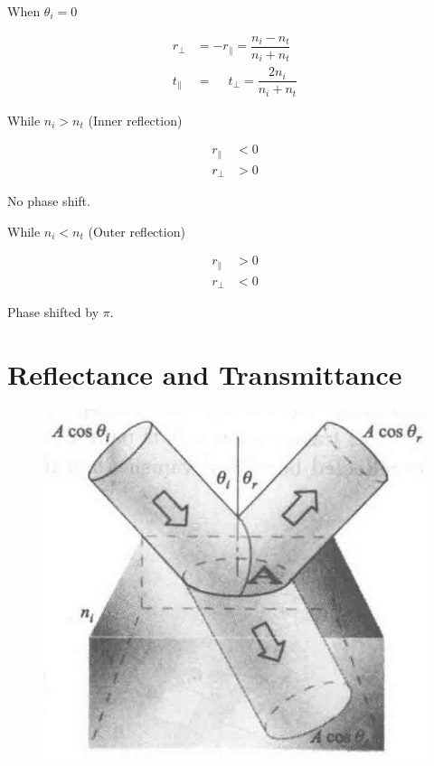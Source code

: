 When $\theta_i = 0$

\begin{equation*}
  \begin{aligned}
    r_{\perp} &= - r_{\parallel} = \dfrac{n_i - n_t}{n_i + n_t} \\
    t_{\parallel} &= \phantom{+} t_{\perp} = \dfrac{2 n_i}{n_i + n_t} 
  \end{aligned}
\end{equation*}

While $n_i > n_t$ (Inner reflection)

\begin{equation*}
  \begin{aligned}
    r_{\parallel} &< 0 \\
    r_{\perp} &> 0
  \end{aligned}
\end{equation*}

No phase shift.

While $n_i < n_t$ (Outer reflection)

\begin{equation*}
  \begin{aligned}
    r_{\parallel} &> 0 \\
    r_{\perp} &< 0
  \end{aligned}
\end{equation*}

Phase shifted by $\pi$.

\section{Reflectance and Transmittance}

\begin{figure}[H]
  \centering
  \includegraphics[width=0.4\linewidth]{figures/Reflectance and Transmittance}
  \label{fig:}
\end{figure}


